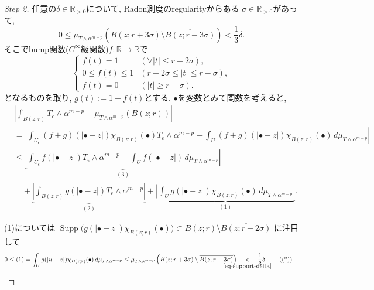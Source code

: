 \begin{proof}
[Step 2] 任意の$\delta\in\mathbb{R}_{>0}$について, 
 Radon測度のregularityからある
$\sigma\in\mathbb{R}_{>0}$があって, 
\begin{equation}
\label{eq-support-delta}
0
\leq
\mu_{T\wedge\alpha^{m-p}}
\left(
B(z;r+3\sigma)\setminus\overline{B(z;r-3\sigma)}
\right)
<
\frac{1}{3}\delta.
\end{equation}
そこでbump関数($C^\infty$級関数)$f\colon\mathbb{R}\longrightarrow\mathbb{R}$で
\begin{equation*}
\begin{cases}
f(t)=1 & (\forall |t|\leq r-2\sigma),\\
0\leq f(t)\leq1 & (r-2\sigma\leq|t|\leq r-\sigma),\\
f(t)=0 & (|t|\geq r-\sigma).
\end{cases}
\end{equation*}
となるものを取り, $g(t):=1-f(t)$とする. 
$\bullet$を変数とみて関数を考えると, 
\begin{align*}
&
\left|
\int_{B(z;r)}T_\epsilon\wedge\alpha^{m-p}
-
\mu_{T\wedge\alpha^{m-p}}(B(z;r))
\right|\\
&=
\left|
\int_{U_\epsilon}
(f+g)(|\bullet-z|)\chi_{B(z;r)}(\bullet)
T_\epsilon\wedge\alpha^{m-p}
-
\int_U
(f+g)(|\bullet-z|)\chi_{B(z;r)}(\bullet)
\,d\mu_{T\wedge\alpha^{m-p}}
\right|\\
&\leq
\underbrace{
\left|
\int_{U_\epsilon}
f(|\bullet-z|)T_\epsilon\wedge\alpha^{m-p}
-
\int_U f(|\bullet-z|)
\,d\mu_{T\wedge\alpha^{m-p}}
\right|
}_{(3)}\\
&\quad+
\underbrace{\left|
\int_{B(z;r)}
g(|\bullet-z|)T_\epsilon\wedge\alpha^{m-p}
\right|}_{(2)}
+
\underbrace{\left|
\int_U
g(|\bullet-z|)\chi_{B(z;r)}(\bullet)
\,d\mu_{T\wedge\alpha^{m-p}}
\right|
}_{(1)}.
\end{align*}

(1)については
$\operatorname{Supp}\bigl(g(|\bullet-z|)\chi_{B(z;r)}(\bullet)\bigr)
\subset
B(z;r)\setminus\overline{B(z;r-2\sigma)}$
に注目して
\begin{align*}
0
&\leq
(1)
=
\int_U
g(|u-z|)\chi_{B(z;r)}(\bullet)
\,d\mu_{T\wedge\alpha^{m-p}}
\leq
\mu_{T\wedge\alpha^{m-p}}
\left(
B(z;r+3\sigma)\setminus\overline{B(z;r-3\sigma)}
\right)
\underalign{\eqref{eq-support-delta}}{<}
\frac{1}{3}\delta.
\tag{(*)}
\end{align*}


\end{proof}
